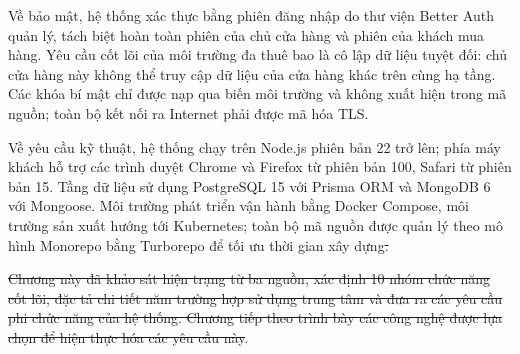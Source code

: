 \documentclass[../main.tex]{subfiles}
\providecommand{\DIFdel}[1]{{\protect\color{red}\sout{#1}}} %
\providecommand{\DIFdelbegin}{} %
\providecommand{\DIFdelend}{} %
\begin{document}
Về bảo mật, hệ thống xác thực bằng phiên đăng nhập do thư viện Better Auth quản lý, tách biệt hoàn toàn phiên của chủ cửa hàng và phiên của khách mua hàng. Yêu cầu cốt lõi của môi trường đa thuê bao là cô lập dữ liệu tuyệt đối: chủ cửa hàng này không thể truy cập dữ liệu của cửa hàng khác trên cùng hạ tầng. Các khóa bí mật chỉ được nạp qua biến môi trường và không xuất hiện trong mã nguồn; toàn bộ kết nối ra Internet phải được mã hóa TLS.

Về yêu cầu kỹ thuật, hệ thống chạy trên Node.js phiên bản 22 trở lên; phía máy khách hỗ trợ các trình duyệt Chrome và Firefox từ phiên bản 100, Safari từ phiên bản 15. Tầng dữ liệu sử dụng PostgreSQL 15 với Prisma ORM và MongoDB 6 với Mongoose. Môi trường phát triển vận hành bằng Docker Compose, môi trường sản xuất hướng tới Kubernetes; toàn bộ mã nguồn được quản lý theo mô hình Monorepo bằng Turborepo để tối ưu thời gian xây dựng\DIFdelbegin \DIFdel{.
}%

\DIFdel{Chương này đã khảo sát hiện trạng từ ba nguồn, xác định 10 nhóm chức năng cốt lõi, đặc tả chi tiết năm trường hợp sử dụng trung tâm và đưa ra các yêu cầu phi chức năng của hệ thống. Chương tiếp theo trình bày các công nghệ được lựa chọn để hiện thực hóa các yêu cầu này}\DIFdelend .
\end{document}
